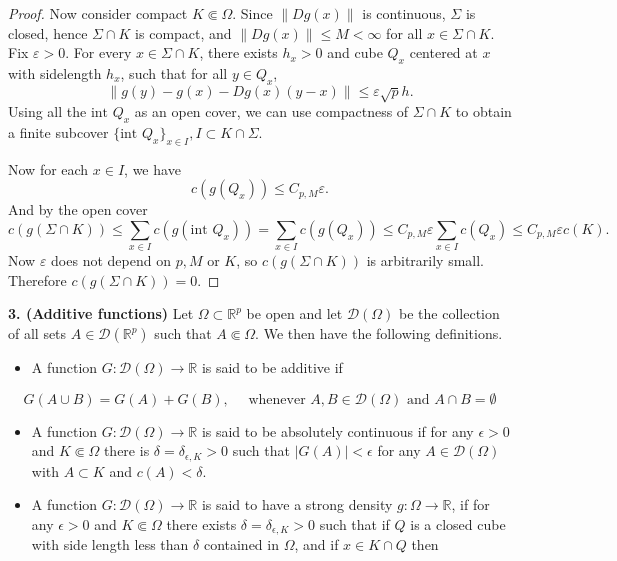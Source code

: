 \begin{proof}
	Now consider compact $K \Subset \Omega$. Since $\|Dg(x)\|$ is continuous, $\Sigma$ is closed, hence $\Sigma \cap K$ is compact, and $\|Dg(x)\|\le M < \infty $ for all $x \in \Sigma \cap K$. Fix $\varepsilon>0$. For every $x \in \Sigma \cap K$, there exists $h_x>0$ and cube $Q_x$ centered at $x$ with sidelength $h_x$, such that for all $y \in Q_x$, 
	\[
		\|g(y) - g(x) - Dg(x) (y-x)\|\le \varepsilon \sqrt{p}  h
	.\] 
	Using all the $\text{int }Q_x$ as an open cover, we can use compactness of $\Sigma \cap K$ to obtain a finite subcover $\{\text{int }Q_x\}_{x \in I}, I \subset K \cap \Sigma$. 

	Now for each $x \in I$, we have
	\[
		c(g(Q_x)) \le  C_{p, M} \varepsilon
	.\] 
	And by the open cover
	\[
		c(g(\Sigma \cap K)) \le \sum_{x \in I} c(g(\text{int }Q_x)) = \sum_{x \in I} c(g(Q_x)) \le C_{p, M} \varepsilon \sum_{x \in I} c(Q_x) \le  C_{p, M} \varepsilon c(K)
	.\] 
	Now $\varepsilon$ does not depend on $p, M$ or $K$, so $c(g(\Sigma \cap K))$ is arbitrarily small. Therefore $c(g(\Sigma \cap K)) = 0$.
\end{proof}


\newpage

\textbf{3. (Additive functions)} Let $\Omega \subset \mathbb{R}^{p}$ be open and let $\mathcal{D}(\Omega)$ be the collection of all sets $A \in \mathcal{D}\left(\mathbb{R}^{p}\right)$ such that $A \Subset \Omega$. We then have the following definitions.

\begin{itemize}
  \item A function $G: \mathcal{D}(\Omega) \rightarrow \mathbb{R}$ is said to be additive if
\end{itemize}

$$
G(A \cup B)=G(A)+G(B), \quad \text { whenever } A, B \in \mathcal{D}(\Omega) \text { and } A \cap B=\emptyset
$$

\begin{itemize}
  \item A function $G: \mathcal{D}(\Omega) \rightarrow \mathbb{R}$ is said to be absolutely continuous if for any $\epsilon>0$ and $K \Subset \Omega$ there is $\delta=\delta_{\epsilon, K}>0$ such that $|G(A)|<\epsilon$ for any $A \in \mathcal{D}(\Omega)$ with $A \subset K$ and $c(A)<\delta$.

  \item A function $G: \mathcal{D}(\Omega) \rightarrow \mathbb{R}$ is said to have a strong density $g: \Omega \rightarrow \mathbb{R}$, if for any $\epsilon>0$ and $K \Subset \Omega$ there exists $\delta=\delta_{\epsilon, K}>0$ such that if $Q$ is a closed cube with side length less than $\delta$ contained in $\Omega$, and if $x \in K \cap Q$ then

\end{itemize}

